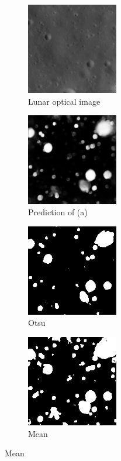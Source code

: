 \documentclass[11pt]{article}
\begin{document}
\begin{figure}[H]
	\begin{subfigure}{5cm}
		\centering\includegraphics[width=4cm]{files/results/26.png}\hfill
		\caption{Lunar optical image}\hfill
	\end{subfigure}
	\begin{subfigure}{5cm}
		\centering\includegraphics[width=4cm]{files/results/26_predict.png}\hfill
		\caption{Prediction of (a)}\hfill
	\end{subfigure}
	\begin{subfigure}{5cm}
		\centering\includegraphics[width=4cm]{files/results/otsu.png}\hfill
		\caption{Otsu}\hfill
	\end{subfigure}
	\begin{subfigure}{5cm}
		\centering\includegraphics[width=4cm]{files/results/mean.png}\hfill
		\caption{Mean}\hfill
	\end{subfigure}

\end{figure}
\end{document}
